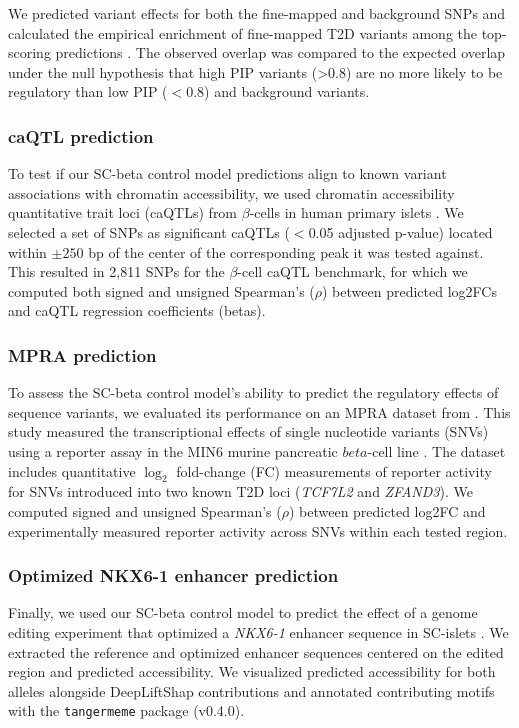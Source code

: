 We predicted variant effects for both the fine-mapped and background SNPs and calculated the empirical enrichment of fine-mapped T2D variants among the top-scoring predictions \cite{Pampari2025-lm}. The observed overlap was compared to the expected overlap under the null hypothesis that high PIP variants (>0.8) are no more likely to be regulatory than low PIP ($<$0.8) and background variants.

\subsubsection{caQTL prediction}

To test if our SC-beta control model predictions align to known variant associations with chromatin accessibility, we used chromatin accessibility quantitative trait loci (caQTLs) from $\beta$-cells in human primary islets \cite{Mummey2024-kx}. We selected a set of SNPs as significant caQTLs ($<$0.05 adjusted p-value) located within \(\pm250\) bp of the center of the corresponding peak it was tested against. This resulted in 2,811 SNPs for the $\beta$-cell caQTL benchmark, for which we computed both signed and unsigned Spearman's (\(\rho\)) between predicted log2FCs and caQTL regression coefficients (betas).

\subsubsection{MPRA prediction}

To assess the SC-beta control model’s ability to predict the regulatory effects of sequence variants, we evaluated its performance on an MPRA dataset from \cite{Kircher2019-di}. This study measured the transcriptional effects of single nucleotide variants (SNVs) using a reporter assay in the MIN6 murine pancreatic $beta$-cell line \cite{Miyazaki1990-zz}. The dataset includes quantitative \(\log_2\) fold-change (FC) measurements of reporter activity for SNVs introduced into two known T2D loci (\textit{TCF7L2} and \textit{ZFAND3}). We computed signed and unsigned Spearman's (\(\rho\)) between predicted log2FC and experimentally measured reporter activity across SNVs within each tested region.

\subsubsection{Optimized NKX6-1 enhancer prediction}

Finally, we used our SC-beta control model to predict the effect of a genome editing experiment that optimized a \textit{NKX6-1} enhancer sequence in SC-islets \cite{Geusz2021-mr}. We extracted the reference and optimized enhancer sequences centered on the edited region and predicted accessibility. We visualized predicted accessibility for both alleles alongside DeepLiftShap contributions and annotated contributing motifs with the \texttt{tangermeme} package (v0.4.0).

